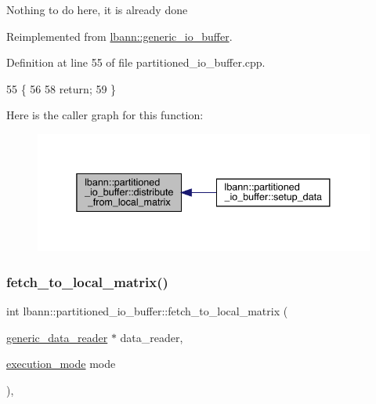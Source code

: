 Nothing to do here, it is already done 

Reimplemented from \hyperlink{classlbann_1_1generic__io__buffer_a08c2bb93b86d2926df52ef9272a07d87}{lbann\+::generic\+\_\+io\+\_\+buffer}.



Definition at line 55 of file partitioned\+\_\+io\+\_\+buffer.\+cpp.


\begin{DoxyCode}
55                                                                                                            
                              \{
56 
58   \textcolor{keywordflow}{return};
59 \}
\end{DoxyCode}
Here is the caller graph for this function\+:\nopagebreak
\begin{figure}[H]
\begin{center}
\leavevmode
\includegraphics[width=338pt]{classlbann_1_1partitioned__io__buffer_a906b8b13a8b9a9e8080d4e4d4bba25bc_icgraph}
\end{center}
\end{figure}
\mbox{\label{classlbann_1_1partitioned__io__buffer_a777719c9cebe912dc4c005e2c78d77c8}} 
\subsubsection{\texorpdfstring{fetch\+\_\+to\+\_\+local\+\_\+matrix()}{fetch\_to\_local\_matrix()}}
{\footnotesize\ttfamily int lbann\+::partitioned\+\_\+io\+\_\+buffer\+::fetch\+\_\+to\+\_\+local\+\_\+matrix (\begin{DoxyParamCaption}\item[{\hyperlink{classlbann_1_1generic__data__reader}{generic\+\_\+data\+\_\+reader} $\ast$}]{data\+\_\+reader,  }\item[{\hyperlink{base_8hpp_a2781a159088df64ed7d47cc91c4dc0a8}{execution\+\_\+mode}}]{mode }\end{DoxyParamCaption})\hspace{0.3cm}{\ttfamily [override]}, {\ttfamily [virtual]}}

